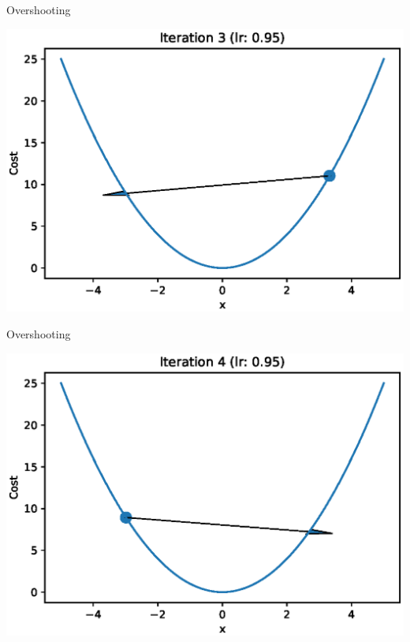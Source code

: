 \documentclass{beamer}
\begin{document}
	\begin{frame}{Overshooting}
		\begin{center}
			\includegraphics[totalheight=6cm]{gradient-descent/overshooting-3.eps}
		\end{center}
	\end{frame}
	
	\begin{frame}{Overshooting}
		\begin{center}
			\includegraphics[totalheight=6cm]{gradient-descent/overshooting-4.eps}
		\end{center}
	\end{frame}
	
\end{document}
